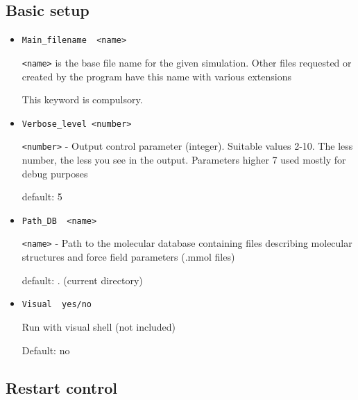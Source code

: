 \documentclass{article}
\begin{document}
\subsection{Basic setup}

\begin{itemize}
\item
\verb|Main_filename  <name>|

\verb|<name>| is the base file name for the given simulation. 
Other files requested or created by the program have this name with 
various extensions
 
This keyword is compulsory.

\item
\verb|Verbose_level <number>|

\verb|<number>| - Output control parameter (integer). 
Suitable values 2-10. The less number, the less you see in the output.
Parameters higher 7 used mostly for debug purposes  

default: 5

\item
\verb|Path_DB  <name>|

\verb|<name>| - Path to the molecular database containing files describing 
molecular structures and force field parameters (.mmol files)

default:  .       (current directory)

\item
\verb|Visual  yes/no|

Run with visual shell (not included)

Default: no

\end{itemize}

\subsection{Restart control}
\end{document}
